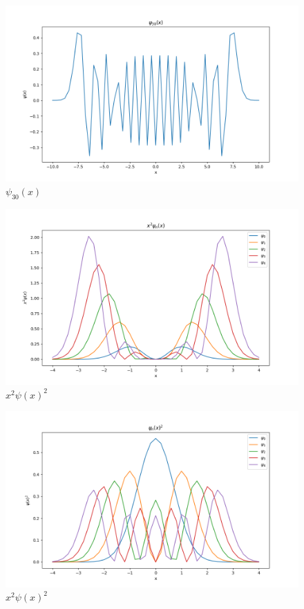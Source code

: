 \documentclass{article}
\begin{document}
\begin{figure}
    \centering
    \includegraphics[width=\linewidth]{psi_30.png}
    \caption{$\psi_{30}(x)$}
    \label{fig:enter-label}
\end{figure}

\begin{figure}
    \centering
    \includegraphics[width=1\linewidth]{psi_1-4_rms.png}
    \caption{$x^2\psi(x)^2$}
    \label{fig:enter-label}
\end{figure}

\begin{figure}
    \centering
    \includegraphics[width=\linewidth]{psi_1-4_norm.png}
    \caption{$x^2\psi(x)^2$}
    \label{fig:enter-label}
\end{figure}
\end{document}

